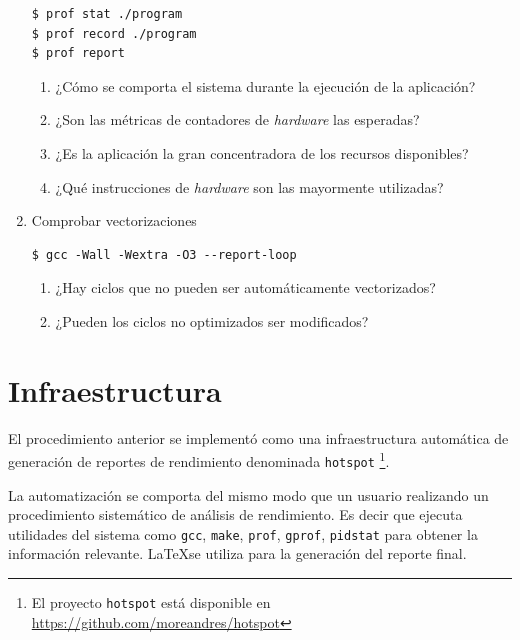 \documentclass[a4paper]{report}
\begin{document}
\begin{enumerate}
\begin{lstlisting}[caption={Generación de Perfil de Sistema},label={lst:profall}]
$ prof stat ./program
$ prof record ./program
$ prof report
\end{lstlisting}

\begin{enumerate}
\item ¿Cómo se comporta el sistema durante la ejecución de la aplicación?
\item ¿Son las métricas de contadores de {\it hardware} las esperadas?
\item ¿Es la aplicación la gran concentradora de los recursos disponibles?
\item ¿Qué instrucciones de {\it hardware} son las mayormente utilizadas?
\end{enumerate}

\item Comprobar vectorizaciones

\begin{lstlisting}[caption={Información de Vectorización},label={lst:report}]
$ gcc -Wall -Wextra -O3 --report-loop
\end{lstlisting}

\begin{enumerate}
\item ¿Hay ciclos que no pueden ser automáticamente vectorizados?
\item ¿Pueden los ciclos no optimizados ser modificados?
\end{enumerate}

\end{enumerate}

\section{Infraestructura}

El procedimiento anterior se implementó como una infraestructura automática de generación de reportes de rendimiento denominada 
{\tt hotspot} \footnote{El proyecto {\tt hotspot} está disponible en \href{https://github.com/moreandres/hotspot}{https://github.com/moreandres/hotspot}}.

\bigskip

La automatización se comporta del mismo modo que un usuario realizando un procedimiento sistemático de análisis de rendimiento.
Es decir que ejecuta utilidades del sistema como {\tt gcc}, {\tt make}, {\tt prof}, {\tt gprof}, {\tt pidstat} para obtener la información relevante.
\LaTeX se utiliza para la generación del reporte final.
\end{document}
